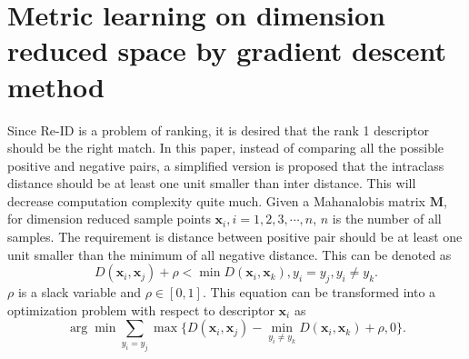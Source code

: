 \documentclass[conference,compsoc]{IEEEtran}
\begin{document}
 
\section{Metric learning on dimension reduced space by gradient descent method}
Since Re-ID is a problem of ranking, it is desired that the rank 1 descriptor should be the right match. In this paper, instead of comparing all the possible positive and negative pairs, a simplified version is proposed that the intraclass distance should be at least one unit smaller than inter distance. This will decrease computation complexity quite much. Given a Mahanalobis matrix $\bm{M}$, for dimension reduced sample points $\bm{x}_i, i = 1,2,3,\cdots,n$, $n$ is the number of all samples. The requirement is distance between positive pair should be at least one unit smaller than the minimum of all negative distance. This can be denoted as 
 \begin{equation}
 D(\bm{x}_i,\bm{x}_j) + \rho < \min D(\bm{x}_i,\bm{x}_k), y_i = y_j, y_i\ne y_k.
 \end{equation}
 $\rho$ is a slack variable and $\rho \in [0,1]$. This equation can be transformed into a optimization problem with respect to descriptor $\bm{x}_i$ as
 \begin{equation}\label{term2}
 \arg \min \sum_{y_i = y_j} \max \{D(\bm{x}_i,\bm{x}_j) -  \min_{ y_i\ne y_k} D(\bm{x}_i,\bm{x}_k)  + \rho, 0 \}.
 \end{equation}
 
\end{document}
